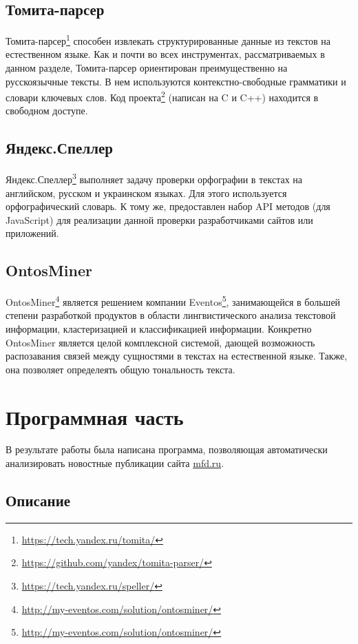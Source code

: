 \documentclass[14pt]{matmex-diploma-custom}
\begin{document}
\subsection{Томита-парсер}

Томита-парсер\footnote{\url{https://tech.yandex.ru/tomita/}} способен извлекать структурированные данные из текстов на естественном языке. Как и почти во всех инструментах, рассматриваемых в данном разделе, Томита-парсер ориентирован преимущественно на русскоязычные тексты. В нем используются контекстно-свободные грамматики и словари ключевых слов. Код проекта\footnote{\url{https://github.com/yandex/tomita-parser/}} (написан на C и C++) находится в свободном доступе.

\subsection{Яндекс.Спеллер}

Яндекс.Спеллер\footnote{\url{https://tech.yandex.ru/speller/}} выполняет задачу проверки орфографии в текстах на английском, русском и украинском языках. Для этого используется орфографический словарь. К тому же, предоставлен набор API методов (для JavaScript) для реализации данной проверки разработчиками сайтов или приложений.

\subsection{OntosMiner}

OntosMiner\footnote{\url{http://my-eventos.com/solution/ontosminer/}} является решением компании Eventos\footnote{\url{http://my-eventos.com/solution/ontosminer/}}, занимающейся в большей степени разработкой продуктов в области лингвистического анализа текстовой информации, кластеризацией и классификацией информации. Конкретно OntosMiner является целой комплексной системой, дающей возможность распозавания связей между сущностями в текстах на естественной языке. Также, она позволяет определеять общую тональность текста.

\clearpage\section{Программная часть}

\label{sec:program}

В результате работы была написана программа, позволяющая автоматически анализировать новостные публикации сайта \url{mfd.ru}.

\subsection{Описание}
\end{document}
